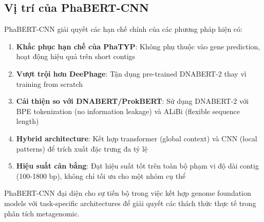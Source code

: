 \begin{table}[h]
\centering
\caption{So sánh các phương pháp phân loại lối sống phage}
\label{tab:method_comparison}
\end{table}

\subsection{Vị trí của PhaBERT-CNN}

PhaBERT-CNN giải quyết các hạn chế chính của các phương pháp hiện có:

\begin{enumerate}
    \item \textbf{Khắc phục hạn chế của PhaTYP}: Không phụ thuộc vào gene prediction, hoạt động hiệu quả trên short contigs

    \item \textbf{Vượt trội hơn DeePhage}: Tận dụng pre-trained DNABERT-2 thay vì training from scratch

    \item \textbf{Cải thiện so với DNABERT/ProkBERT}: Sử dụng DNABERT-2 với BPE tokenization (no information leakage) và ALiBi (flexible sequence length)

    \item \textbf{Hybrid architecture}: Kết hợp transformer (global context) và CNN (local patterns) để trích xuất đặc trưng đa tỷ lệ

    \item \textbf{Hiệu suất cân bằng}: Đạt hiệu suất tốt trên toàn bộ phạm vi độ dài contig (100-1800 bp), không chỉ tối ưu cho một nhóm cụ thể
\end{enumerate}

PhaBERT-CNN đại diện cho sự tiến bộ trong việc kết hợp genome foundation models với task-specific architectures để giải quyết các thách thức thực tế trong phân tích metagenomic.
